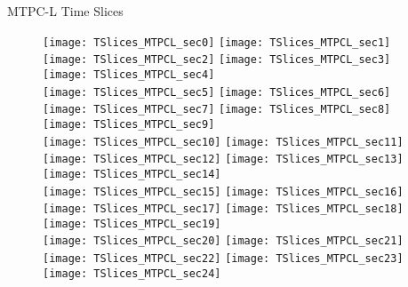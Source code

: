 \documentclass[11pt]{beamer}
\begin{document}
\begin{frame}{MTPC-L Time Slices}
\begin{figure}
\centering
\texttt{[image: TSlices\_MTPCL\_sec0]}
\texttt{[image: TSlices\_MTPCL\_sec1]}
\texttt{[image: TSlices\_MTPCL\_sec2]}
\texttt{[image: TSlices\_MTPCL\_sec3]}
\texttt{[image: TSlices\_MTPCL\_sec4]}\\
\texttt{[image: TSlices\_MTPCL\_sec5]}
\texttt{[image: TSlices\_MTPCL\_sec6]}
\texttt{[image: TSlices\_MTPCL\_sec7]}
\texttt{[image: TSlices\_MTPCL\_sec8]}
\texttt{[image: TSlices\_MTPCL\_sec9]}\\
\texttt{[image: TSlices\_MTPCL\_sec10]}
\texttt{[image: TSlices\_MTPCL\_sec11]}
\texttt{[image: TSlices\_MTPCL\_sec12]}
\texttt{[image: TSlices\_MTPCL\_sec13]}
\texttt{[image: TSlices\_MTPCL\_sec14]}\\
\texttt{[image: TSlices\_MTPCL\_sec15]}
\texttt{[image: TSlices\_MTPCL\_sec16]}
\texttt{[image: TSlices\_MTPCL\_sec17]}
\texttt{[image: TSlices\_MTPCL\_sec18]}
\texttt{[image: TSlices\_MTPCL\_sec19]}\\
\texttt{[image: TSlices\_MTPCL\_sec20]}
\texttt{[image: TSlices\_MTPCL\_sec21]}
\texttt{[image: TSlices\_MTPCL\_sec22]}
\texttt{[image: TSlices\_MTPCL\_sec23]}
\texttt{[image: TSlices\_MTPCL\_sec24]}
\end{figure}
\end{frame}
\end{document}
